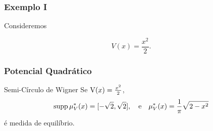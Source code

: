 \begin{frame}[t]
	\frametitle{Exemplo I}
	
	Consideremos
		
	\[
			V(x) = \frac{x^2}{2}.
	\]
	


\end{frame}

\begin{frame}
	\frametitle{Potencial Quadrático}
	\begin{block}{Semi-Círculo de Wigner}
		Se $\operatorname{V}(x) = \frac{x^2}{2}$,
		\[
		\supp{\mu^*_V(x)} = [-\sqrt{2}, \sqrt{2}], \ \ \ \text{e} \ \ \ \mu^*_V(x) = \frac{1}{\pi} \sqrt{2 - x^2}
		\]
		é medida de equilíbrio.
	\end{block}
\end{frame}


